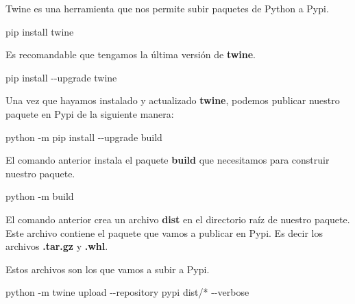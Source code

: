 \documentclass[
  a4paper,
  DIV=11,
  numbers=noendperiod,
  onepage,
  openany]{scrreprt}
\newenvironment{Shaded}{\begin{snugshade}}{\end{snugshade}}
\newcommand{\AttributeTok}[1]{\textcolor[rgb]{0.40,0.45,0.13}{#1}}
\newcommand{\ExtensionTok}[1]{\textcolor[rgb]{0.00,0.23,0.31}{#1}}
\newcommand{\NormalTok}[1]{\textcolor[rgb]{0.00,0.23,0.31}{#1}}
\newcommand{\PreprocessorTok}[1]{\textcolor[rgb]{0.68,0.00,0.00}{#1}}
\begin{document}
\begin{tcolorbox}
Twine es una herramienta que nos permite subir paquetes de Python a
Pypi.

\begin{Shaded}
\begin{Highlighting}[]
\ExtensionTok{pip}\NormalTok{ install twine}
\end{Highlighting}
\end{Shaded}

Es recomandable que tengamos la última versión de \textbf{twine}.

\begin{Shaded}
\begin{Highlighting}[]
\ExtensionTok{pip}\NormalTok{ install }\AttributeTok{{-}{-}upgrade}\NormalTok{ twine}
\end{Highlighting}
\end{Shaded}

Una vez que hayamos instalado y actualizado \textbf{twine}, podemos
publicar nuestro paquete en Pypi de la siguiente manera:

\begin{Shaded}
\begin{Highlighting}[]
\ExtensionTok{python} \AttributeTok{{-}m}\NormalTok{ pip install }\AttributeTok{{-}{-}upgrade}\NormalTok{ build}
\end{Highlighting}
\end{Shaded}

El comando anterior instala el paquete \textbf{build} que necesitamos
para construir nuestro paquete.

\begin{Shaded}
\begin{Highlighting}[]
\ExtensionTok{python} \AttributeTok{{-}m}\NormalTok{ build}
\end{Highlighting}
\end{Shaded}

El comando anterior crea un archivo \textbf{dist} en el directorio raíz
de nuestro paquete. Este archivo contiene el paquete que vamos a
publicar en Pypi. Es decir los archivos \textbf{.tar.gz} y
\textbf{.whl}.

Estos archivos son los que vamos a subir a Pypi.

\begin{Shaded}
\begin{Highlighting}[]
\ExtensionTok{python} \AttributeTok{{-}m}\NormalTok{ twine upload }\AttributeTok{{-}{-}repository}\NormalTok{ pypi dist/}\PreprocessorTok{*} \AttributeTok{{-}{-}verbose}
\end{Highlighting}
\end{Shaded}


\end{tcolorbox}
\end{document}
